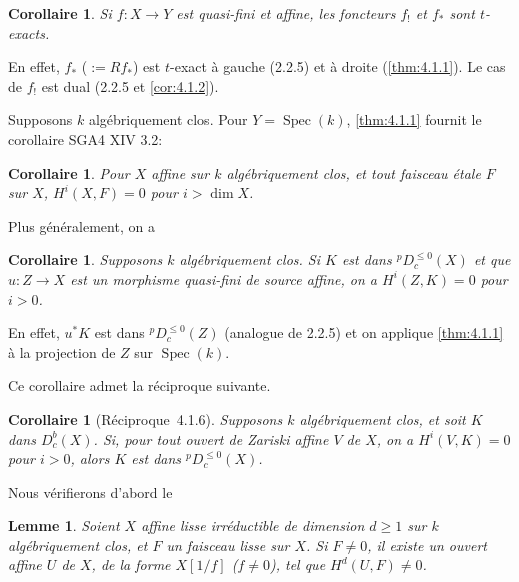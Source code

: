 \documentclass[12pt,a4paper]{article}
\theoremstyle{plain}
\newtheorem{lemma}[theorem]{Lemme}
\newtheorem{corollary}[theorem]{Corollaire}
\theoremstyle{definition}
\DeclareMathOperator{\Spec}{Spec}
\providecommand{\Spec}{\operatorname{Spec}}
\begin{document}
\begin{corollary}\label{cor:4.1.3}
Si $f: X \to Y$ est quasi-fini et affine, les foncteurs $f_{!}$ et $f_{*}$ sont $t$-exacts.
\end{corollary}

En effet, $f_{*}$ ($:= Rf_{*}$) est $t$-exact \`{a} gauche (2.2.5) et \`{a} droite (\ref{thm:4.1.1}). Le cas de $f_{!}$ est dual (2.2.5 et \ref{cor:4.1.2}).

Supposons $k$ alg\'{e}briquement clos. Pour $Y = \Spec(k)$, \ref{thm:4.1.1} fournit le corollaire SGA4 XIV 3.2:

\begin{corollary}\label{cor:4.1.4}
Pour $X$ affine sur $k$ alg\'{e}briquement clos, et tout faisceau \'{e}tale $F$ sur $X$, $H^{i}(X,F) = 0$ pour $i > \dim X$.
\end{corollary}

Plus g\'{e}n\'{e}ralement, on a

\begin{corollary}\label{cor:4.1.5}
Supposons $k$ alg\'{e}briquement clos. Si $K$ est dans ${}^{p}D_{c}^{\leq 0}(X)$ et que $u: Z \to X$ est un morphisme quasi-fini de source affine, on a $H^{i}(Z,K) = 0$ pour $i > 0$.
\end{corollary}

En effet, $u^{*}K$ est dans ${}^{p}D_{c}^{\leq 0}(Z)$ (analogue de 2.2.5) et on applique \ref{thm:4.1.1} \`{a} la projection de $Z$ sur $\Spec(k)$.

Ce corollaire admet la r\'{e}ciproque suivante.

\begin{corollary}[R\'{e}ciproque~4.1.6]\label{cor:4.1.6}
Supposons $k$ alg\'{e}briquement clos, et soit $K$ dans $D_{c}^{b}(X)$. Si, pour tout ouvert de Zariski affine $V$ de $X$, on a $H^{i}(V,K) = 0$ pour $i > 0$, alors $K$ est dans ${}^{p}D_{c}^{\leq 0}(X)$.
\end{corollary}

Nous v\'{e}rifierons d'abord le

\begin{lemma}\label{lem:4.1.7}
Soient $X$ affine lisse irr\'{e}ductible de dimension $d \geq 1$ sur $k$ alg\'{e}briquement clos, et $F$ un faisceau lisse sur $X$. Si $F \neq 0$, il existe un ouvert affine $U$ de $X$, de la forme $X[1/f]$ ($f \neq 0$), tel que $H^{d}(U,F) \neq 0$.
\end{lemma}
\end{document}
